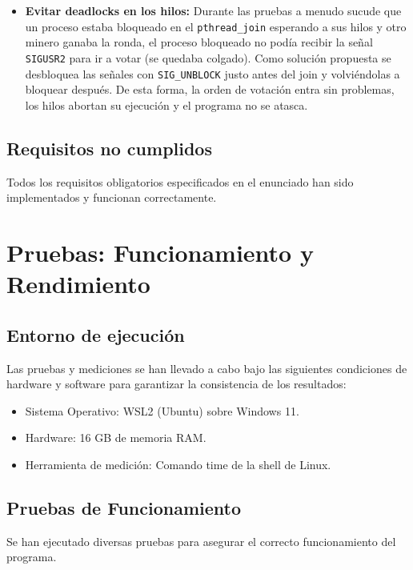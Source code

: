 \documentclass[11pt,a4paper]{article}
\begin{document}
\begin{itemize}
\begin{itemize}
    ni votando, ni gestionando la victoria, se pone a dormir llamando a \texttt{ sigsuspend(\&mask\_empty) }. Esto vacía la máscara de bloqueos temporalmente
     y deja al proceso suspendido hasta que llega una señal que lo despierta para la siguiente fase.
    \item \textbf{Evitar deadlocks en los hilos:} Durante las pruebas a menudo sucude que un proceso estaba bloqueado en el \texttt{pthread\_join} esperando a sus hilos y otro minero ganaba la ronda,
     el proceso bloqueado no podía recibir la señal \texttt{SIGUSR2} para ir a votar (se quedaba colgado).
    Como solución propuesta se desbloquea las señales con \texttt{SIG\_UNBLOCK} justo antes del join y volviéndolas a bloquear después. De 
    esta forma, la orden de votación entra sin problemas, los hilos abortan su ejecución y el programa no se atasca.
    \end{itemize}
\end{itemize}

\subsection{Requisitos no cumplidos}
Todos los requisitos obligatorios especificados en el enunciado han sido implementados 
y funcionan correctamente.

\section{Pruebas: Funcionamiento y Rendimiento}
\subsection{Entorno de ejecución}
Las pruebas y mediciones se han llevado a cabo bajo las siguientes condiciones de
hardware y software para garantizar la consistencia de los resultados:
\begin{itemize}
    \item Sistema Operativo: WSL2 (Ubuntu) sobre Windows 11.
    \item Hardware: 16 GB de memoria RAM.
    \item Herramienta de medición: Comando time de la shell de Linux.
\end{itemize}
\clearpage
\subsection{Pruebas de Funcionamiento}
Se han ejecutado diversas pruebas para asegurar el correcto funcionamiento del programa.
\end{document}
